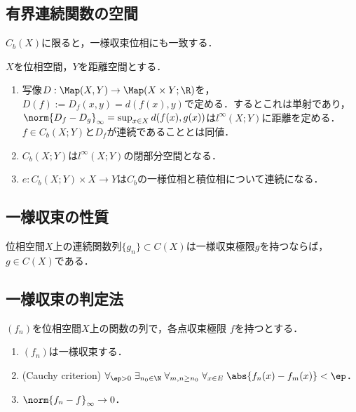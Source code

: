 \documentclass[uplatex,dvipdfmx]{jsreport}
\begin{document}
\subsection{有界連続関数の空間}

\begin{tcolorbox}[colframe=ForestGreen, colback=ForestGreen!10!white,breakable,colbacktitle=ForestGreen!40!white,coltitle=black,fonttitle=\bfseries\sffamily,
title=]
    $C_b(X)$に限ると，一様収束位相にも一致する．
\end{tcolorbox}

\begin{proposition}
    $X$を位相空間，$Y$を距離空間とする．
    \begin{enumerate}
        \item 写像$D:\Map(X,Y)\to\Map(X\times Y;\R)$を，$D(f):=D_f(x,y)=d(f(x),y)$で定める．するとこれは単射であり，$\norm{D_f-D_g}_\infty=\sup_{x\in X}d(f(x),g(x))$は$l^\infty(X;Y)$に距離を定める．$f\in C_b(X;Y)$と$D_f$が連続であることとは同値．
        \item $C_b(X;Y)$は$l^\infty(X;Y)$の閉部分空間となる．
        \item $e:C_b(X;Y)\times X\to Y$は$C_b$の一様位相と積位相について連続になる．
    \end{enumerate}
\end{proposition}

\subsection{一様収束の性質}

\begin{proposition}
    位相空間$X$上の連続関数列$\{g_n\}\subset C(X)$は一様収束極限$g$を持つならば，$g\in C(X)$である．
\end{proposition}

\subsection{一様収束の判定法}

\begin{proposition}[一様収束の判定法]
    $(f_n)$を位相空間$X$上の関数の列で，各点収束極限
    $f$を持つとする．
    \begin{enumerate}
        \item $(f_n)$は一様収束する．
        \item (Cauchy criterion) $\forall_{\ep>0}\;\exists_{n_0\in\N}\;\forall_{m,n\ge n_0}\;\forall_{x\in E}\;\abs{f_n(x)-f_m(x)}<\ep$．
        \item $\norm{f_n-f}_\infty\to0$．
    \end{enumerate}
\end{proposition}
\end{document}
